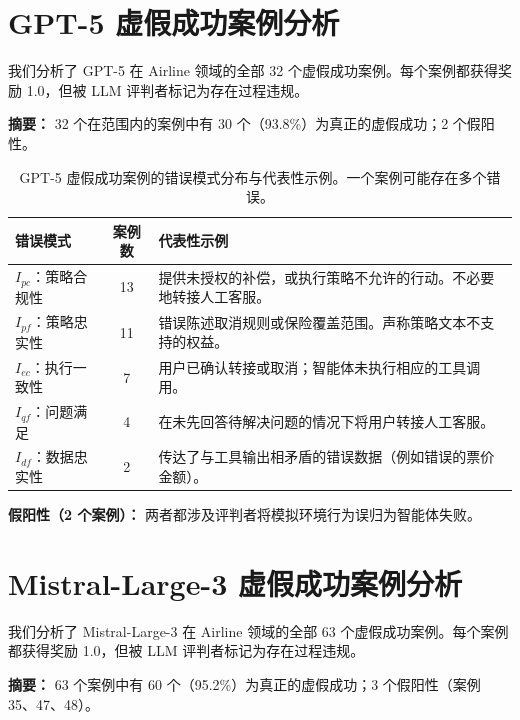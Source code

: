 \documentclass[11pt,UTF8,fontset=fandol]{ctexart}
\begin{document}
\section{GPT-5 虚假成功案例分析}

我们分析了 GPT-5 在 Airline 领域的全部 32 个虚假成功案例。每个案例都获得奖励 1.0，但被 LLM 评判者标记为存在过程违规。

\textbf{摘要：} 32 个在范围内的案例中有 30 个（93.8\%）为真正的虚假成功；2 个假阳性。

\begin{table}[H]\centering
\caption{GPT-5 虚假成功案例的错误模式分布与代表性示例。一个案例可能存在多个错误。}
\label{tab:6}
\begin{tabular}{p{4.2cm}cp{7cm}}
\toprule
错误模式 & 案例数 & 代表性示例 \\
\midrule
$I_{pc}$：策略合规性 & 13 & 提供未授权的补偿，或执行策略不允许的行动。不必要地转接人工客服。 \\
$I_{pf}$：策略忠实性 & 11 & 错误陈述取消规则或保险覆盖范围。声称策略文本不支持的权益。 \\
$I_{ec}$：执行一致性 & 7 & 用户已确认转接或取消；智能体未执行相应的工具调用。 \\
$I_{qf}$：问题满足 & 4 & 在未先回答待解决问题的情况下将用户转接人工客服。 \\
$I_{df}$：数据忠实性 & 2 & 传达了与工具输出相矛盾的错误数据（例如错误的票价金额）。 \\
\bottomrule
\end{tabular}
\end{table}

\textbf{假阳性（2 个案例）：} 两者都涉及评判者将模拟环境行为误归为智能体失败。

\section{Mistral-Large-3 虚假成功案例分析}

我们分析了 Mistral-Large-3 在 Airline 领域的全部 63 个虚假成功案例。每个案例都获得奖励 1.0，但被 LLM 评判者标记为存在过程违规。

\textbf{摘要：} 63 个案例中有 60 个（95.2\%）为真正的虚假成功；3 个假阳性（案例 35、47、48）。
\end{document}
